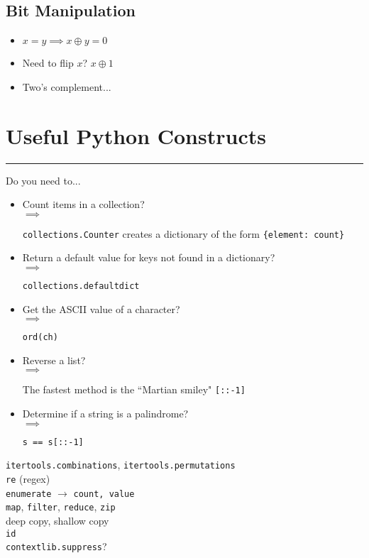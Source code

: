 \documentclass[12pt, titlepage]{article}
\newcommand{\imply}[1]{
  \-\hspace{1em}$\implies$ \parbox[t]{11.2cm}{#1}
}
\begin{document}
\subsection{Bit Manipulation}

\begin{itemize}
  \item $x = y \implies x \oplus y = 0$
  \item Need to flip $x$? $x \oplus 1$
  \item Two's complement...
\end{itemize}

\section{Useful Python Constructs}
\hrule\vspace{5ex}

Do you need to...
\begin{itemize}
  \item Count items in a collection? \smallskip\\
    \imply{\texttt{collections.Counter} creates a dictionary of the form \texttt{\{element: count\}}}
  \item Return a default value for keys not found in a dictionary? \smallskip\\
    \imply{\texttt{collections.defaultdict}}
  \item Get the ASCII value of a character? \smallskip\\
    \imply{\texttt{ord(ch)}}
  \item Reverse a list? \smallskip\\
    \imply{The fastest method is the ``Martian smiley" \texttt{[::-1]}}
  \item Determine if a string is a palindrome? \smallskip\\
    \imply{\texttt{s == s[::-1]}}
\end{itemize}

\texttt{itertools.combinations}, \texttt{itertools.permutations} \\
\texttt{re} (regex) \\
\texttt{enumerate} $\rightarrow$ \texttt{count, value} \\
\texttt{map}, \texttt{filter}, \texttt{reduce}, \texttt{zip} \\
deep copy, shallow copy \\
\texttt{id} \\
\texttt{contextlib.suppress}?
\end{document}
